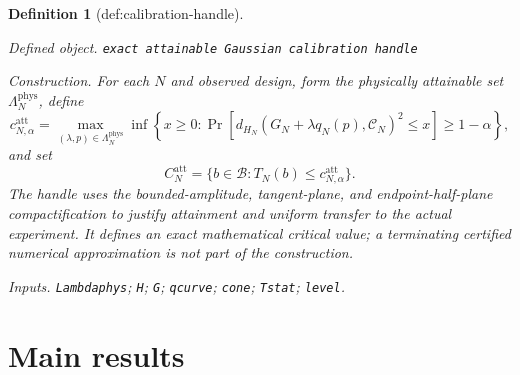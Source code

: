 \documentclass{article}
\newtheorem{definition}{Definition}
\begin{document}
\begin{definition}[def:calibration-handle]\label{def:calibration-handle}
\par\smallskip\noindent\emph{Defined object.} \texttt{exact attainable Gaussian calibration handle}
\par\smallskip\noindent\emph{Construction.} For each \(N\) and observed design, form the physically attainable set \(\Lambda_N^{\mathrm{phys}}\), define
\[
c_{N,\alpha}^{\mathrm{att}}
=\max_{(\lambda,p)\in\Lambda_N^{\mathrm{phys}}}
\inf\!\left\{x\ge0:
\Pr\!\left[d_{H_N}(G_N+\lambda q_N(p),\mathcal C_N)^2\le x\right]
\ge1-\alpha\right\},
\]
and set
\[
C_N^{\mathrm{att}}=\{b\in\mathcal B:T_N(b)\le c_{N,\alpha}^{\mathrm{att}}\}.
\]
The handle uses the bounded-amplitude, tangent-plane, and endpoint-half-plane compactification to justify attainment and uniform transfer to the actual experiment.  It defines an exact mathematical critical value; a terminating certified numerical approximation is not part of the construction.
\par\smallskip\noindent\emph{Inputs.} \texttt{Lambdaphys}; \texttt{H}; \texttt{G}; \texttt{qcurve}; \texttt{cone}; \texttt{Tstat}; \texttt{level}.
\end{definition}

\section{Main results}
\end{document}
